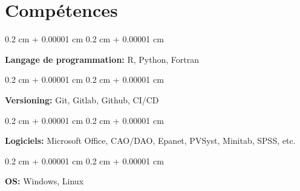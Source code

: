 \documentclass[10pt, letterpaper]{article}
\newenvironment{onecolentry}{
  \begin{adjustwidth}{
    0.2 cm + 0.00001 cm
  }{
    0.2 cm + 0.00001 cm
  }
}{
  \end{adjustwidth}
} %
\begin{document}
\section{Compétences}
  \begin{onecolentry}
    \textbf{Langage de programmation:} R, Python, Fortran
  \end{onecolentry}

  \vspace{0.2 cm}

  \begin{onecolentry}
    \textbf{Versioning:} Git, Gitlab, Github, CI/CD
  \end{onecolentry}

  \vspace{0.2 cm}

  \begin{onecolentry}
    \textbf{Logiciels:} Microsoft Office, CAO/DAO, Epanet, PVSyst, Minitab, SPSS, etc.
  \end{onecolentry}

  \vspace{0.2 cm}

  \begin{onecolentry}
    \textbf{OS:} Windows, Linux
  \end{onecolentry}
\end{document}
